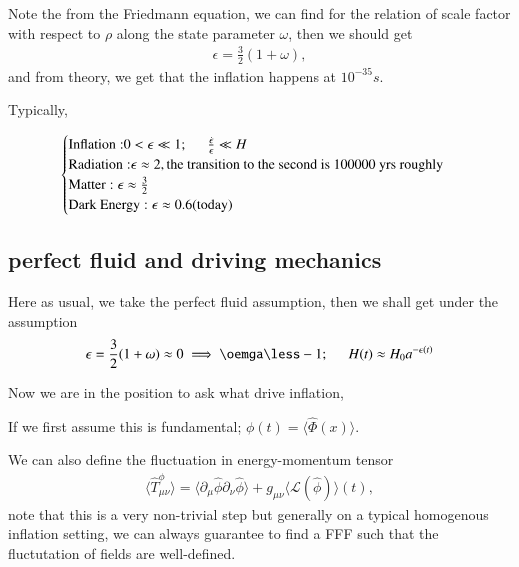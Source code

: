 \documentclass[a4paper, 12pt]{article}
\begin{document}
{{{Note the from the Friedmann equation, we can find for the relation of
scale factor with respect to \( \rho \) along the state parameter \(
\omega\), then we should get 
\begin{align}
  \label{slow roll parameter}
  \epsilon = \frac{3}{2} (1 + \omega),
\end{align} and from theory, we get that the inflation happens at $
10^{-35}s $. 
\vspace{0.5cm}

Typically, 

\begin{align}
  \label{slow roll scenarios}
  \begin{cases} 
    \mathrm{Inflation: } 0 < \epsilon \ll 1; \hspace{0.5cm}
    \frac{\dot{\epsilon}}{\epsilon} \ll H \\ 
    \mathrm{Radiation: } \epsilon \approx 2, \textnormal{the
    transition to the second is 100000 yrs roughly} \\ 
    \textnormal{Matter}: \epsilon \approx  \frac{3}{2} \\ 
    \textnormal{Dark Energy}: \epsilon \approx 0.6 (\mathrm{today})
  \end{cases}
\end{align}


\subsection{perfect fluid and driving mechanics}%
  \label{sub:perfect fluid}
  
  Here as usual, we take the perfect fluid assumption, then we shall get
  under the assumption 
  \begin{align}
    \label{fluid assumption}
    \epsilon = \frac{3}{2} (1 + \omega) \approx 0 \implies \oemga
    \less -1; \hspace{0.5cm} H(t) \approx H_0 a^{- \epsilon(t)} 
  \end{align}

Now we are in the position to ask what drive inflation, 

If we first assume this is fundamental; \( \phi(t) = \langle \hat{\Phi}(x)
\rangle   \). 

We can also define the fluctuation in energy-momentum tensor 
\begin{align}
  \label{fluct energy tensor}
  \langle \hat{T}_{\mu \nu}^{\phi} \rangle  = \langle
  \partial_{\mu}^{} \hat{\phi} \partial_{\nu}^{} \hat{\phi} \rangle + g_{\mu
  \nu} \langle  \mathcal{L}(\hat{\phi}) \rangle (t), 
\end{align} note that this is a very non-trivial step but generally on
a typical homogenous inflation setting, we can always guarantee to find a
FFF such that the fluctutation of fields are well-defined.
 

}}}
\end{document}
